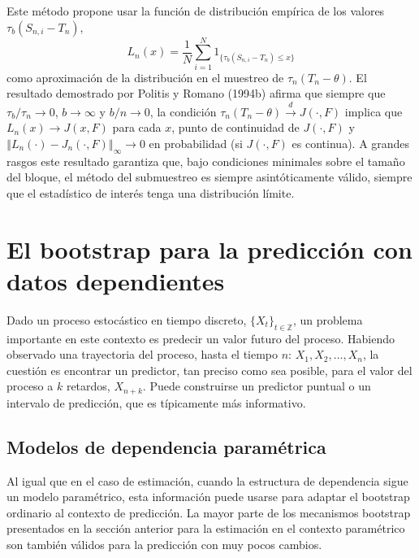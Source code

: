 \documentclass[
]{book}
\theoremstyle{break}
\theoremstyle{definition}
\theoremstyle{definition}
\theoremstyle{definition}
\theoremstyle{remark}
\begin{document}
Este método propone usar la función de distribución empírica de los
valores \(\tau _{b}(S_{n,i}-T_n)\),
\[L_n(x)=\frac{1}{N}\sum_{i=1}^{N}1_{\{\tau _{b}(S_{n,i}-T_n)\leq x\}}\]
como aproximación de la distribución en el muestreo de \(\tau_n(T_n-\theta )\).
El resultado demostrado por Politis y Romano (1994b) afirma que siempre que
\(\tau _{b}/\tau _n\rightarrow 0\), \(b \rightarrow \infty\) y
\(b/n\rightarrow 0\), la condición \(\tau _n(T_n-\theta )\overset{d}{\rightarrow}J(\cdot ,F)\) implica que \(L_n(x)\rightarrow J(x,F)\) para cada \(x\), punto de continuidad de \(J(\cdot ,F)\) y
\(\left\Vert L_n(\cdot )-J_n(\cdot ,F)\right\Vert _{\infty }\rightarrow 0\) en
probabilidad (si \(J(\cdot ,F)\) es continua). A grandes rasgos este
resultado garantiza que, bajo condiciones minimales sobre el tamaño del
bloque, el método del submuestreo es siempre asintóticamente válido,
siempre que el estadístico de interés tenga una distribución límite.

\hypertarget{el-bootstrap-para-la-predicciuxf3n-con-datos-dependientes}{%
\section{El bootstrap para la predicción con datos dependientes}\label{el-bootstrap-para-la-predicciuxf3n-con-datos-dependientes}}

Dado un proceso estocástico en tiempo discreto,
\(\{X_{t}\}_{t\in \mathbb{ Z}}\), un problema importante en este contexto es predecir un valor
futuro del proceso. Habiendo observado una trayectoria del proceso,
hasta el tiempo \(n\): \(X_1,X_2,\ldots ,X_n\), la cuestión es
encontrar un predictor, tan preciso como sea posible, para el valor del
proceso a \(k\) retardos,
\(X_{n+k}\). Puede construirse un predictor puntual o un intervalo de
predicción, que es típicamente más informativo.

\hypertarget{modelos-de-dependencia-paramuxe9trica}{%
\subsection{Modelos de dependencia paramétrica}\label{modelos-de-dependencia-paramuxe9trica}}

Al igual que en el caso de estimación, cuando la estructura de
dependencia sigue un modelo paramétrico, esta información puede usarse
para adaptar el bootstrap ordinario al contexto de predicción. La mayor
parte de los mecanismos bootstrap presentados en la sección anterior
para la estimación en el contexto paramétrico son también válidos para
la predicción con muy pocos cambios.
\end{document}
